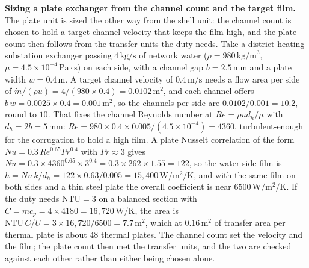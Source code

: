 \textbf{Sizing a plate exchanger from the channel count and the target film.} The
plate unit is sized the other way from the shell unit: the channel count is chosen
to hold a target channel velocity that keeps the film high, and the plate count then
follows from the transfer units the duty needs. Take a district-heating substation
exchanger passing $4\,\text{kg/s}$ of network water ($\rho = 980\,\text{kg/m}^3$,
$\mu = 4.5\times 10^{-4}\,\text{Pa}\cdot\text{s}$) on each side, with a channel gap
$b = 2.5\,\si{\milli\meter}$ and a plate width $w = 0.4\,\text{m}$. A target channel
velocity of $0.4\,\text{m/s}$ needs a flow area per side of $\dot{m}/(\rho u) =
4/(980\times 0.4) = 0.0102\,\text{m}^2$, and each channel offers $b\,w = 0.0025
\times 0.4 = 0.001\,\text{m}^2$, so the channels per side are $0.0102/0.001 = 10.2$,
round to $10$. That fixes the channel Reynolds number at $Re = \rho u d_h/\mu$ with
$d_h = 2b = 5\,\si{\milli\meter}$: $Re = 980\times 0.4\times 0.005/(4.5\times
10^{-4}) = 4360$, turbulent-enough for the corrugation to hold a high film. A plate
Nusselt correlation of the form $Nu = 0.3\,Re^{0.65}Pr^{0.4}$ with $Pr \approx 3$
gives $Nu = 0.3\times 4360^{0.65}\times 3^{0.4} = 0.3\times 262\times 1.55 = 122$,
so the water-side film is $h = Nu\,k/d_h = 122\times 0.63/0.005 = 15{,}400\,\si{\watt
\per\meter\squared\per\kelvin}$, and with the same film on both sides and a thin
steel plate the overall coefficient is near $6500\,\si{\watt\per\meter\squared\per
\kelvin}$. If the duty needs $\text{NTU} = 3$ on a balanced section with $C =
\dot{m}c_p = 4\times 4180 = 16{,}720\,\si{\watt\per\kelvin}$, the area is
$\text{NTU}\,C/U = 3\times 16{,}720/6500 = 7.7\,\text{m}^2$, which at
$0.16\,\text{m}^2$ of transfer area per thermal plate is about $48$ thermal plates.
The channel count set the velocity and the film; the plate count then met the
transfer units, and the two are checked against each other rather than either being
chosen alone.

